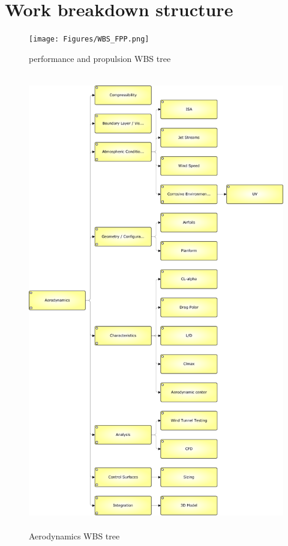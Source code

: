 \documentclass[a4paper]{report}
\begin{document}
\chapter{Work breakdown structure}

\begin{figure}
\label{fig:WBSFPP}
\centering
\texttt{[image: Figures/WBS\_FPP.png]}
\caption{performance and propulsion WBS tree}
\end{figure}

\begin{figure}
\label{fig:WBSA}
\centering
\includegraphics[height=20cm]{Figures/WBS_A.png}
\caption{Aerodynamics WBS tree}
\end{figure}
\end{document}
